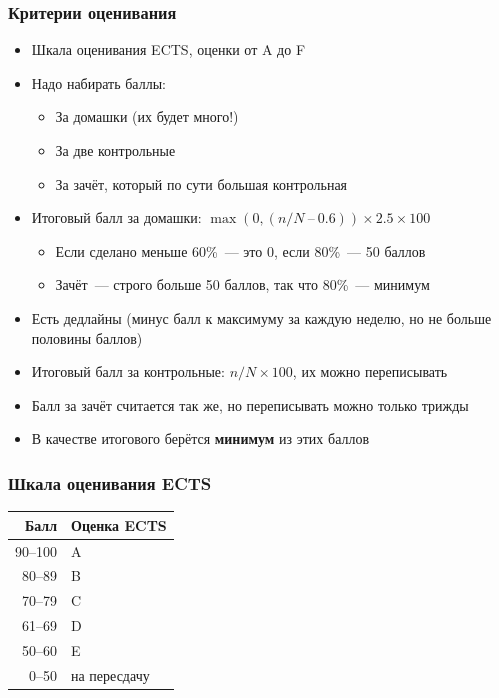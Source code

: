 \documentclass[aspectratio=169]{beamer}
\begin{document}
\begin{frame}
    \frametitle{Критерии оценивания}
    \begin{itemize}
        \item Шкала оценивания ECTS, оценки от A до F
        \item Надо набирать баллы:
              \begin{itemize}
                  \item За домашки (их будет много!)
                  \item За две контрольные
                  \item За зачёт, который по сути большая контрольная
              \end{itemize}
        \item Итоговый балл за домашки: $\max(0, (n/N\ –\ 0.6)) \times 2.5 \times 100$
              \begin{itemize}
                  \item Если сделано меньше 60\%~--- это 0, если 80\%~--- 50 баллов
                  \item Зачёт~--- строго больше 50 баллов, так что 80\%~--- минимум
              \end{itemize}
        \item Есть дедлайны (минус балл к максимуму за каждую неделю, но не больше половины баллов)
        \item Итоговый балл за контрольные: $n/N \times 100$, их можно переписывать
        \item Балл за зачёт считается так же, но переписывать можно только трижды
        \item В качестве итогового берётся \textbf{минимум} из этих баллов
    \end{itemize}
\end{frame}

\begin{frame}
    \frametitle{Шкала оценивания ECTS}

    \begin{center}
        \begin{tabular}{rl}
            \toprule
            Балл    & Оценка ECTS  \\
            \midrule
            90--100 & A            \\
            80--89  & B            \\
            70--79  & C            \\
            61--69  & D            \\
            50--60  & E            \\
            0--50   & на пересдачу \\
            \bottomrule
        \end{tabular}
    \end{center}

\end{frame}
\end{document}
